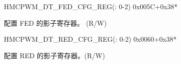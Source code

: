 \begin{register}{H}{MCPWM\_DT\_FED\_CFG\_REG(: 0-2)}
{0x005C+0x38*}\label{regdesc:MCPWMDTNFEDCFGREG}
%
%
\regnewline%
\begin{regdesc}\begin{reglist}
\label{fielddesc:MCPWMDBNFED}\item [MCPWM\_DB\regindex{n}\_FED] 配置 FED 的影子寄存器。 (R/W)
\end{reglist}\end{regdesc}
\end{register}


\begin{register}{H}{MCPWM\_DT\_RED\_CFG\_REG(: 0-2)}
{0x0060+0x38*}\label{regdesc:MCPWMDTNREDCFGREG}
%
%
\regnewline%
\begin{regdesc}\begin{reglist}
\label{fielddesc:MCPWMDBNRED}\item [MCPWM\_DB\regindex{n}\_RED] 配置 RED 的影子寄存器。(R/W)
\end{reglist}\end{regdesc}
\end{register}


